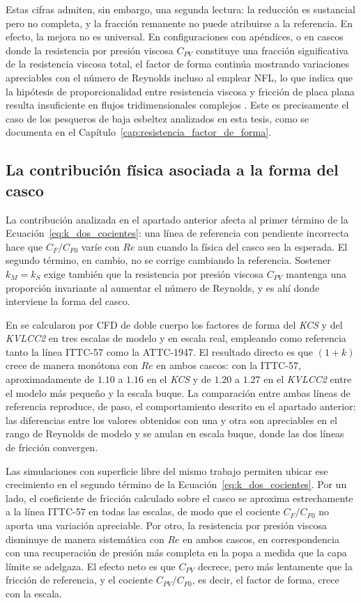 Estas cifras admiten, sin embargo, una segunda lectura: la reducción es
sustancial pero no completa, y la fracción remanente no puede atribuirse a la
referencia. En efecto, la mejora no es universal. En configuraciones con
apéndices, o en cascos donde la resistencia por presión viscosa $C_{PV}$
constituye una fracción significativa de la resistencia viscosa total, el factor
de forma continúa mostrando variaciones apreciables con el número de Reynolds
incluso al emplear NFL, lo que indica que la hipótesis de proporcionalidad entre
resistencia viscosa y fricción de placa plana resulta insuficiente en flujos
tridimensionales complejos \citep{wang2015numericalFL}. Este es precisamente el
caso de los pesqueros de baja esbeltez analizados en esta tesis, como se
documenta en el Capítulo~\ref{cap:resistencia_factor_de_forma}.

\subsection{La contribución física asociada a la forma del casco}

La contribución analizada en el apartado anterior afecta al primer término de la
Ecuación~\eqref{eq:k_dos_cocientes}: una línea de referencia con pendiente
incorrecta hace que $C_F/C_{F0}$ varíe con $Re$ aun cuando la física del casco
sea la esperada. El segundo término, en cambio, no se corrige cambiando la
referencia. Sostener $k_M = k_S$ exige también que la resistencia por presión
viscosa $C_{PV}$ mantenga una proporción invariante al aumentar el número de
Reynolds, y es ahí donde interviene la forma del casco.

En \citet{DOGRUL2020107428} se calcularon por CFD de doble cuerpo los factores
de forma del \textit{KCS} y del \textit{KVLCC2} en tres escalas de modelo y en escala
real, empleando como referencia tanto la línea ITTC-57 como la ATTC-1947. El
resultado directo es que $(1+k)$ crece de manera monótona con $Re$ en ambos
cascos: con la ITTC-57, aproximadamente de $1.10$ a $1.16$ en el \textit{KCS} y
de $1.20$ a $1.27$ en el \textit{KVLCC2} entre el modelo más pequeño y la escala buque. La
comparación entre ambas líneas de referencia reproduce, de paso, el
comportamiento descrito en el apartado anterior: las diferencias entre los
valores obtenidos con una y otra son apreciables en el rango de Reynolds de
modelo y se anulan en escala buque, donde las dos líneas de fricción convergen.

Las simulaciones con superficie libre del mismo trabajo permiten ubicar ese
crecimiento en el segundo término de la Ecuación~\eqref{eq:k_dos_cocientes}. Por
un lado, el coeficiente de fricción calculado sobre el casco se aproxima
estrechamente a la línea ITTC-57 en todas las escalas, de modo que el cociente
$C_F/C_{F0}$ no aporta una variación apreciable. Por otro, la resistencia por
presión viscosa disminuye de manera sistemática con $Re$ en ambos cascos, en
correspondencia con una recuperación de presión más completa en la popa a medida
que la capa límite se adelgaza. El efecto neto es que $C_{PV}$ decrece, pero más
lentamente que la fricción de referencia, y el cociente $C_{PV}/C_{F0}$, es
decir, el factor de forma, crece con la escala.

